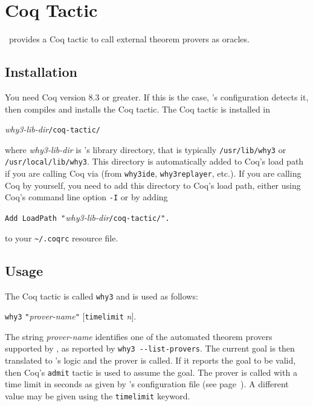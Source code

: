 \chapter{Coq Tactic}
\label{chap:tactic}

\why\ provides a Coq tactic to call external theorem provers as oracles.

\section{Installation}

You need Coq version 8.3 or greater. If this is the case, \why's
configuration detects it, then compiles and installs the Coq tactic.
The Coq tactic is installed in
\begin{center}
  \textit{why3-lib-dir}\texttt{/coq-tactic/}
\end{center}
where \textit{why3-lib-dir} is \why's library directory, that is typically
\texttt{/usr/lib/why3} or \texttt{/usr/local/lib/why3}. This directory
is automatically added to Coq's load path if you are
calling Coq via \why (from \texttt{why3ide}, \texttt{why3replayer},
etc.). If you are calling Coq by yourself, you need to add
this directory to Coq's load path, either using Coq's command line
option \texttt{-I} or by adding
\begin{center}
  \verb+Add LoadPath "+\textit{why3-lib-dir}\verb+/coq-tactic/".+
\end{center}
to your \texttt{\~{}/.coqrc} resource file.

\section{Usage}

The Coq tactic is called \texttt{why3} and is used as follows:
\begin{center}
  \texttt{why3} \verb+"+\textit{prover-name}\verb+"+
  $[$\texttt{timelimit} \textit{n}$]$.
\end{center}
The string \textit{prover-name} identifies one of the automated theorem provers
supported by \why, as reported by \verb+why3 --list-provers+.
The current goal is then translated to \why's logic and the prover is
called. If it reports the goal to be valid, then Coq's \texttt{admit}
tactic is used to assume the goal. The prover is called with a time
limit in seconds as given by \why's configuration file
(see page~\pageref{sec:whyconffile}). A different value may be given
using the \texttt{timelimit} keyword.

